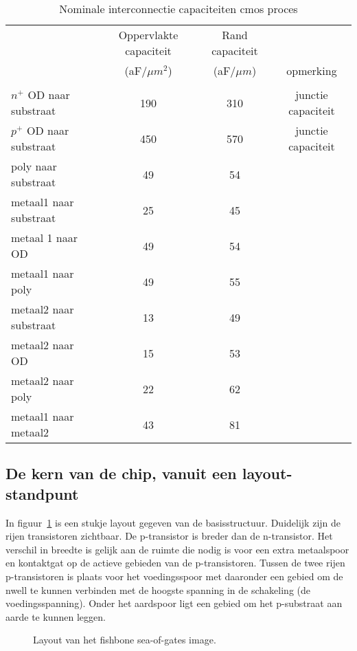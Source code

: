\begin{table}[hbt]
\begin{center}
\begin{tabular}{lccc}
\hline
& Oppervlakte capaciteit & Rand capaciteit &\\
& (aF$/\mu m^2$) & (aF$/\mu m$) & opmerking\\
\hline\\
$n^+$ OD naar substraat & 190 & 310 & junctie capaciteit\\
$p^+$ OD naar substraat & 450 & 570 & junctie capaciteit\\
poly naar substraat & 49 & 54 \\
metaal1 naar substraat & 25 & 45 \\
metaal 1 naar OD & 49 & 54\\
metaal1 naar poly & 49 & 55\\
metaal2 naar substraat & 13 & 49\\
metaal2 naar OD & 15 & 53\\
metaal2 naar poly & 22 & 62\\
metaal1 naar metaal2 & 43 & 81\\
\hline
\end{tabular}
\caption{Nominale interconnectie capaciteiten cmos proces} 
\label{capaciteit}
\end{center}
\end{table}


\subsection{De kern van de chip,
vanuit een layout-standpunt}

In figuur~\ref{fig-fishbone} is een stukje layout gegeven van de basisstructuur.
Duidelijk zijn de rijen transistoren zichtbaar. De p-transistor
is breder dan de n-transistor. Het verschil in breedte is gelijk
aan de ruimte die nodig is voor een extra metaalspoor en kontaktgat  
op de actieve gebieden van de p-transistoren. Tussen de twee rijen 
p-transistoren is plaats voor het voedingsspoor met daaronder een
 gebied om de nwell te kunnen verbinden met de hoogste spanning
in de schakeling (de voedingsspanning). Onder het aardspoor ligt
een  gebied om het p-substraat aan aarde te kunnen leggen.

\begin{figure}
\centerline{}
\caption{Layout van het fishbone sea-of-gates image. 
\label{fig-fishbone}}
\end{figure}

